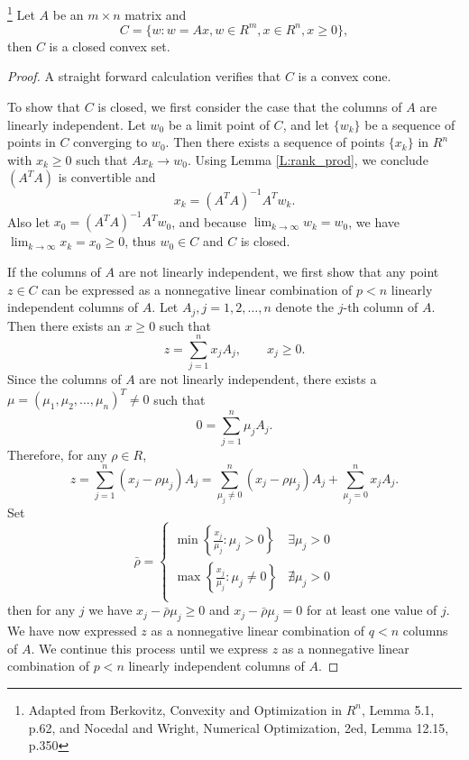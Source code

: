 \begin{lemma} \label{L:convex_close}
\footnote{Adapted from Berkovitz, Convexity and Optimization in $R^n$, Lemma
          5.1, p.62, and Nocedal and Wright, Numerical Optimization, 2ed,
          Lemma 12.15, p.350}
Let $A$ be an $m\times n$ matrix and 
\[
  C= \{w: w=Ax, w\in R^m, x\in R^n, x\ge 0 \},
\]
then $C$ is a closed convex set.
\end{lemma}
\begin{proof}
A straight forward calculation verifies that $C$ is a convex cone.

To show that $C$ is closed, we first consider the case that the columns of 
$A$ are linearly independent. Let $w_0$ be a limit point of $C$, and let 
$\{w_k\}$ be a sequence of points in $C$ converging to $w_0$. Then there
exists a sequence of points $\{x_k\}$ in $R^n$ with $x_k\ge 0$ such that
$Ax_k\to w_0$. Using Lemma \ref{L:rank_prod}, we conclude $(A^T A)$
is convertible and 
\[
  x_k = (A^T A)^{-1} A^T w_k.
\]
Also let $x_0 = (A^T A)^{-1} A^T w_0$, and because 
$\lim_{k\to\infty} w_k=w_0$, we have
$\lim_{k\to\infty} x_k=x_0\ge 0$, thus $w_0\in C$ and $C$ is closed. 

If the columns of $A$ are not linearly independent, we first show that any
point $z\in C$ can be expressed as a nonnegative linear combination of $p<n$
linearly independent columns of $A$. Let $A_j, j=1,2,\dots,n$ denote the 
$j$-th column of $A$. Then there exists an $x\ge 0$ such that
\[
  z = \sum_{j=1}^n x_j A_j, \qquad x_j\ge 0.
\]
Since the columns of $A$ are not linearly independent, there exists a
$\mu=(\mu_1,\mu_2,\dots,\mu_n)^T\neq 0$ such that
\[
  0 = \sum_{j=1}^n \mu_j A_j.
\]
Therefore, for any $\rho\in R$,
\[
  z = \sum_{j=1}^n (x_j -\rho \mu_j) A_j 
    = \sum_{\mu_j\neq 0}^n (x_j -\rho \mu_j) A_j 
      + \sum_{\mu_j= 0}^n x_j A_j. 
\]
Set 
\[
  \bar{\rho} =
    \begin{cases}
      \min \left\{ \frac{x_j}{\mu_j}: \mu_j>0 \right\}     &\exists \mu_j>0 \\
      \max \left\{ \frac{x_j}{\mu_j}: \mu_j\neq 0 \right\} &\nexists \mu_j>0 \\
    \end{cases}
\]
then for any $j$ we have $x_j-\bar{\rho}\mu_j\ge 0$ and 
$x_j-\bar{\rho}\mu_j= 0$ for at least one value of $j$. We have now expressed 
$z$ as a nonnegative linear combination of $q<n$ columns of $A$. We continue 
this process until we express $z$ as a nonnegative linear combination of 
$p<n$ linearly independent columns of $A$.


\end{proof}
